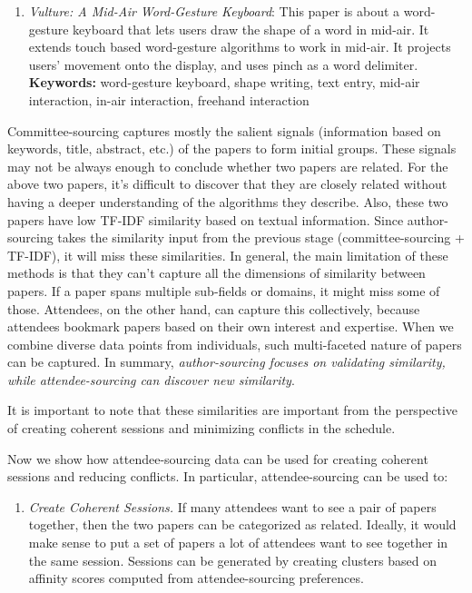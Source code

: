 \documentclass[letterpaper]{article}
\begin{document}
\begin{enumerate}
\begin{enumerate}
\item \emph{Vulture: A Mid-Air Word-Gesture Keyboard}: This paper is about a word-gesture keyboard that lets users draw the shape of a word in mid-air. It extends touch based word-gesture algorithms to work in mid-air. It projects users' movement onto the display, and uses pinch as a word delimiter. \textbf{Keywords:} word-gesture keyboard, shape writing, text entry, mid-air interaction, in-air interaction, freehand interaction
\end{enumerate}
\noindent
Committee-sourcing captures mostly the salient signals (information based on keywords, title, abstract, etc.) of the papers to form initial groups. These signals may not be always enough to conclude whether two papers are related. For the above two papers, it's difficult to discover that they are closely related without having a deeper understanding of the algorithms they describe.  Also, these two papers have low TF-IDF similarity based on textual information. Since author-sourcing takes the similarity input from the previous stage (committee-sourcing + TF-IDF), it will miss these similarities. In general, the main limitation of these methods is that they can't capture all the dimensions of similarity between papers. If a paper spans multiple sub-fields or domains, it might miss some of those. Attendees, on the other hand, can capture this collectively, because attendees bookmark papers based on their own interest and expertise. When we combine diverse data points from individuals, such multi-faceted nature of papers can be captured. In summary, \emph{author-sourcing focuses on validating similarity, while attendee-sourcing can discover new similarity}.

It is important to note that these similarities are important from the perspective of creating coherent sessions and minimizing conflicts in the schedule.

Now we show how attendee-sourcing data can be used for creating coherent sessions and reducing conflicts.  In particular, attendee-sourcing can be used to:
\begin{enumerate}
\item \emph{Create Coherent Sessions.} If many attendees want to see a pair of papers together, then the two papers can be categorized as related. Ideally, it would make sense to put a set of papers a lot of attendees want to see together in the same session. Sessions can be generated by creating clusters based on affinity scores computed from attendee-sourcing preferences.


\end{enumerate}
\end{enumerate}
\end{document}
